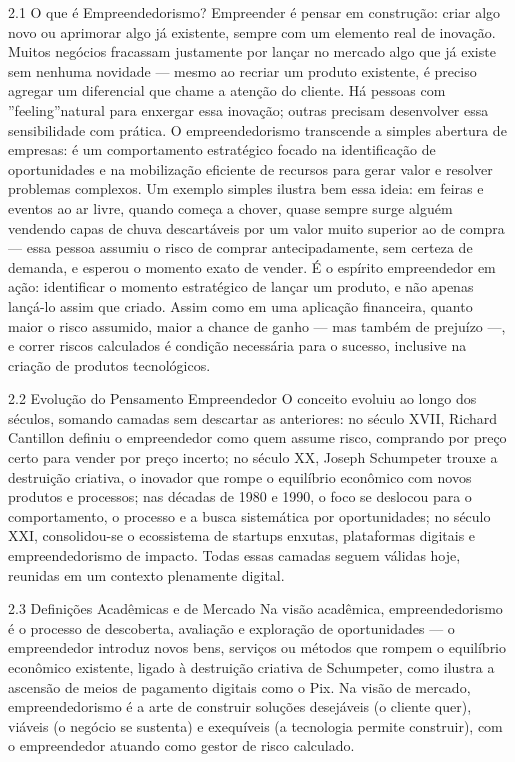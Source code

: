 2.1 O que é Empreendedorismo? Empreender é pensar em construção: criar algo novo ou aprimorar algo já existente, sempre com um elemento real de inovação. Muitos negócios fracassam justamente por lançar no mercado algo que já existe sem nenhuma novidade — mesmo ao recriar um produto existente, é preciso agregar um diferencial que chame a atenção do cliente. Há pessoas com ”feeling”natural para enxergar essa inovação; outras precisam desenvolver essa sensibilidade com prática. O empreendedorismo transcende a simples abertura de empresas: é um comportamento estratégico focado na identificação de oportunidades e na mobilização eficiente de recursos para gerar valor e resolver problemas complexos. Um exemplo simples ilustra bem essa ideia: em feiras e eventos ao ar livre, quando começa a chover, quase sempre surge alguém vendendo capas de chuva descartáveis por um valor muito superior ao de compra — essa pessoa assumiu o risco de comprar antecipadamente, sem certeza de demanda, e esperou o momento exato de vender. É o espírito empreendedor em ação: identificar o momento estratégico de lançar um produto, e não apenas lançá-lo assim que criado. Assim como em uma aplicação financeira, quanto maior o risco assumido, maior a chance de ganho — mas também de prejuízo —, e correr riscos calculados é condição necessária para o sucesso, inclusive na criação de produtos tecnológicos.

2.2 Evolução do Pensamento Empreendedor O conceito evoluiu ao longo dos séculos, somando camadas sem descartar as anteriores: no século XVII, Richard Cantillon definiu o empreendedor como quem assume risco, comprando por preço certo para vender por preço incerto; no século XX, Joseph Schumpeter trouxe a destruição criativa, o inovador que rompe o equilíbrio econômico com novos produtos e processos; nas décadas de 1980 e 1990, o foco se deslocou para o comportamento, o processo e a busca sistemática por oportunidades; no século XXI, consolidou-se o ecossistema de startups enxutas, plataformas digitais e empreendedorismo de impacto. Todas essas camadas seguem válidas hoje, reunidas em um contexto plenamente digital.

2.3 Definições Acadêmicas e de Mercado Na visão acadêmica, empreendedorismo é o processo de descoberta, avaliação e exploração de oportunidades — o empreendedor introduz novos bens, serviços ou métodos que rompem o equilíbrio econômico existente, ligado à destruição criativa de Schumpeter, como ilustra a ascensão de meios de pagamento digitais como o Pix. Na visão de mercado, empreendedorismo é a arte de construir soluções desejáveis (o cliente quer), viáveis (o negócio se sustenta) e exequíveis (a tecnologia permite construir), com o empreendedor atuando como gestor de risco calculado.

